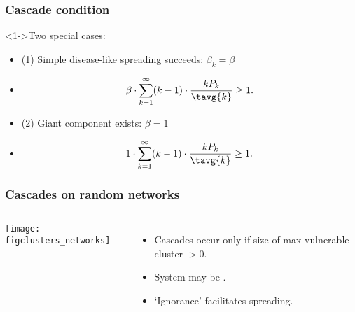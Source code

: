  \begin{frame}
    \frametitle{Cascade condition}

    \begin{block}<1->{Two special cases:}
      \begin{itemize}
      \item<2-> 
        (1) Simple disease-like spreading succeeds: $\beta_k = \beta$
      \item<3->[]
        $$
        \beta 
        \cdot 
        \sum_{k=1}^{\infty} 
        (k-1) 
        \cdot 
        \frac{k P_k}{\tavg{k}}\ge 1.
        $$
      \item<4-> 
        (2) Giant component exists: $\beta = 1$
      \item<5->[]
        $$
        1 \cdot
        \sum_{k=1}^{\infty} 
        (k-1) 
        \cdot 
        \frac{k P_k}{\tavg{k}}
        \ge 1.
        $$
      \end{itemize}
    \end{block}

\end{frame}




\begin{frame}
  \frametitle{Cascades on random networks}
  \begin{block}{}
    \begin{columns}
      \texttt{[image: figclusters\_networks]}\\
      \begin{itemize}
      \item<1-> Cascades occur only if size of max vulnerable cluster $>0$.\\
      \item<2-> 
        System may be .\nocite{carlson1999a,carlson2000a,sornette2003a}
      \item<3-> 
        \alert{`Ignorance'} facilitates spreading.
      \end{itemize}
    \end{columns}
  \end{block}


\end{frame}

